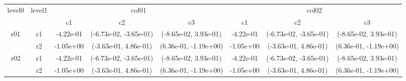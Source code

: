 \begin{tabular}{cccccccc}
\toprule
\multirow{2}{*}{level0} & \multirow{2}{*}{level1}&\multicolumn{3}{c}{col01}&\multicolumn{3}{c}{col02}\tabularnewline
\cmidrule(lr){3-5}
\cmidrule(lr){6-8}
&&c1&c2&c3&c1&c2&c3\tabularnewline
\midrule
\midrule
\multirow{2}{*}{r01}&r1&-4.22e-01& (-6.73e-02, -3.65e-01)& (-8.65e-02, 3.93e-01)&-4.22e-01& (-6.73e-02, -3.65e-01)& (-8.65e-02, 3.93e-01)\tabularnewline
&r2&-1.05e+00& (-3.63e-01, 4.86e-01)& (6.36e-01, -1.19e+00)&-1.05e+00& (-3.63e-01, 4.86e-01)& (6.36e-01, -1.19e+00)\tabularnewline
\midrule
\multirow{2}{*}{r02}&r1&-4.22e-01& (-6.73e-02, -3.65e-01)& (-8.65e-02, 3.93e-01)&-4.22e-01& (-6.73e-02, -3.65e-01)& (-8.65e-02, 3.93e-01)\tabularnewline
&r2&-1.05e+00& (-3.63e-01, 4.86e-01)& (6.36e-01, -1.19e+00)&-1.05e+00& (-3.63e-01, 4.86e-01)& (6.36e-01, -1.19e+00)\tabularnewline
\bottomrule
\end{tabular}
